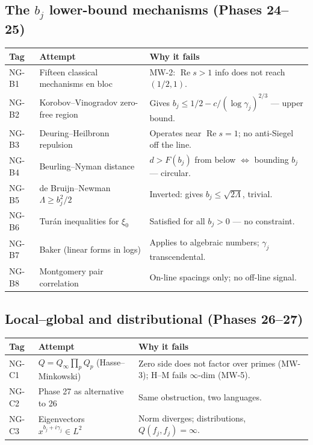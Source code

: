 \documentclass[11pt]{article}
\theoremstyle{remark}
\begin{document}
\subsection{The $b_j$ lower-bound mechanisms (Phases 24--25)}
\begin{longtable}{l p{5.4cm} p{6.4cm}}
\toprule \textbf{Tag} & \textbf{Attempt} & \textbf{Why it fails} \\ \midrule \endhead
NG-B1 & Fifteen classical mechanisms en bloc & MW-2: $\operatorname{Re}s>1$ info does not reach $(1/2,1)$. \\
NG-B2 & Korobov--Vinogradov zero-free region & Gives $b_j\le1/2-c/(\log\gamma_j)^{2/3}$ --- upper bound. \\
NG-B3 & Deuring--Heilbronn repulsion & Operates near $\operatorname{Re}s=1$; no anti-Siegel off the line. \\
NG-B4 & Beurling--Nyman distance & $d>F(b_j)$ from below $\iff$ bounding $b_j$ --- circular. \\
NG-B5 & de Bruijn--Newman $\Lambda\ge b_j^2/2$ & Inverted: gives $b_j\le\sqrt{2\Lambda}$, trivial. \\
NG-B6 & Tur\'an inequalities for $\xi_0$ & Satisfied for all $b_j>0$ --- no constraint. \\
NG-B7 & Baker (linear forms in logs) & Applies to algebraic numbers; $\gamma_j$ transcendental. \\
NG-B8 & Montgomery pair correlation & On-line spacings only; no off-line signal. \\
\bottomrule
\end{longtable}

\subsection{Local--global and distributional (Phases 26--27)}
\begin{longtable}{l p{5.4cm} p{6.4cm}}
\toprule \textbf{Tag} & \textbf{Attempt} & \textbf{Why it fails} \\ \midrule \endhead
NG-C1 & $Q=Q_\infty\prod_pQ_p$ (Hasse--Minkowski) & Zero side does not factor over primes (MW-3); H--M fails $\infty$-dim (MW-5). \\
NG-C2 & Phase 27 as alternative to 26 & Same obstruction, two languages. \\
NG-C3 & Eigenvectors $x^{b_j+i\gamma_j}\in L^2$ & Norm diverges; distributions, $Q(f_j,f_j)=\infty$. \\
\bottomrule
\end{longtable}
\end{document}

